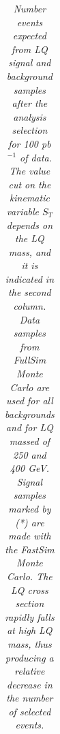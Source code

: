 \begin{table}[htbp]
\begin{center}
\begin{tabular}{|ccc||cccc|}
\hline\hline
\end{tabular}
\end{center}
\caption{\small \sl Number events expected from LQ signal and background samples after the analysis selection for 100 pb$^{-1}$ of data.
The value cut on the kinematic variable $S_T$ depends on the LQ mass, and it is indicated in the second column.
Data samples from FullSim Monte Carlo are used for all backgrounds and for LQ massed of 250 and 400 GeV. Signal samples marked by (*) are
made with the FastSim Monte Carlo.
The LQ cross section rapidly falls at high LQ mass, thus producing a relative decrease in the number of selected events. } 
\label{tab:EventSelSummary}
\end{table}


%
